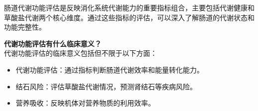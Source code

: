 \documentclass[UTF8]{ctexart}
\begin{document}
\vspace{0.05cm}

\begin{tcolorbox}[
enhanced,
colback=customTealBg,
colframe=gray!3,
arc=3mm,
boxrule=0pt,
width=\textwidth,
top=8pt,
bottom=8pt
]
{\small{\color{customTeal}\faInfoCircle} 肠道代谢功能评估是反映消化系统代谢能力的重要指标组合，主要包括代谢健康和草酸盐代谢两个核心维度。通过这些指标的评估，可以深入了解肠道的代谢状态和功能完整性。
}
\end{tcolorbox}
\begin{tcolorbox}[
    enhanced,
    colback=lightpurple!10, %
    colframe=white,  %
    arc=3mm,
    boxrule=0.5pt,
    width=\textwidth,
    top=8pt,
    bottom=8pt
]
{\small{\color{lightpurple}\faQuestionCircle}\quad \textbf{代谢功能评估有什么临床意义？}\\
{\color{orange!50}\faComments}\quad 代谢功能评估的临床意义包括但不限于以下方面：
\begin{itemize}
    \item 代谢功能评估：通过指标判断肠道代谢效率和能量转化能力。
    \item 结石风险：评估草酸盐代谢情况，预测肾结石等疾病风险。
    \item 营养吸收：反映机体对营养物质的利用效率。
\end{itemize}
}
\end{tcolorbox}
\vspace{-0.7cm}
\end{document}
